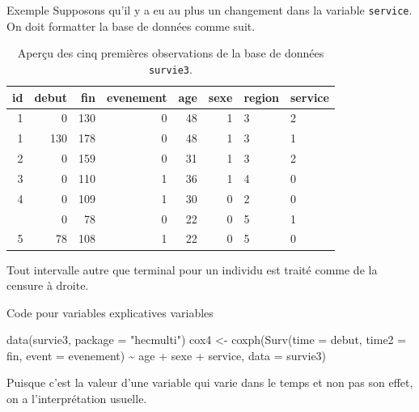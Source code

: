 \documentclass[
  ignorenonframetext,
]{beamer}
\newenvironment{Shaded}{\begin{snugshade}}{\end{snugshade}}
\newcommand{\AttributeTok}[1]{\textcolor[rgb]{0.40,0.45,0.13}{#1}}
\newcommand{\FunctionTok}[1]{\textcolor[rgb]{0.28,0.35,0.67}{#1}}
\newcommand{\NormalTok}[1]{\textcolor[rgb]{0.00,0.23,0.31}{#1}}
\newcommand{\OtherTok}[1]{\textcolor[rgb]{0.00,0.23,0.31}{#1}}
\newcommand{\SpecialCharTok}[1]{\textcolor[rgb]{0.37,0.37,0.37}{#1}}
\newcommand{\StringTok}[1]{\textcolor[rgb]{0.13,0.47,0.30}{#1}}
\begin{document}
\begin{frame}[fragile]{Exemple}
\protect{}\label{exemple}
Supposons qu'il y a eu au plus un changement dans la variable
\texttt{service}. On doit formatter la base de données comme suit.

\footnotesize

\begin{longtable}[t]{rrrrrrll}

\caption{\label{tbl-survie3-donnees}Aperçu des cinq premières
observations de la base de données \texttt{survie3}.}

\tabularnewline

\toprule
id & debut & fin & evenement & age & sexe & region & service\\
\midrule
1 & 0 & 130 & 0 & 48 & 1 & 3 & 2\\
1 & 130 & 178 & 0 & 48 & 1 & 3 & 1\\
2 & 0 & 159 & 0 & 31 & 1 & 3 & 2\\
3 & 0 & 110 & 1 & 36 & 1 & 4 & 0\\
4 & 0 & 109 & 1 & 30 & 0 & 2 & 0\\
\addlinespace
5 & 0 & 78 & 0 & 22 & 0 & 5 & 1\\
5 & 78 & 108 & 1 & 22 & 0 & 5 & 0\\
\bottomrule

\end{longtable}

Tout intervalle autre que terminal pour un individu est traité comme de
la censure à droite.

\normalsize
\end{frame}

\begin{frame}[fragile]{Code pour variables explicatives variables}
\protect{}\label{code-pour-variables-explicatives-variables}
\begin{Shaded}
\begin{Highlighting}[numbers=left,,]
\FunctionTok{data}\NormalTok{(survie3, }\AttributeTok{package =} \StringTok{"hecmulti"}\NormalTok{)}
\NormalTok{cox4 }\OtherTok{\textless{}{-}} \FunctionTok{coxph}\NormalTok{(}\FunctionTok{Surv}\NormalTok{(}\AttributeTok{time =}\NormalTok{ debut, }
                   \AttributeTok{time2 =}\NormalTok{ fin, }
                   \AttributeTok{event =}\NormalTok{ evenement) }\SpecialCharTok{\textasciitilde{}} 
\NormalTok{                age }\SpecialCharTok{+}\NormalTok{ sexe }\SpecialCharTok{+}\NormalTok{ service, }
              \AttributeTok{data =}\NormalTok{ survie3)}
\end{Highlighting}
\end{Shaded}

\footnotesize

Puisque c'est la valeur d'une variable qui varie dans le temps et non
pas son effet, on a l'interprétation usuelle.

\normalsize
\end{frame}
\end{document}
